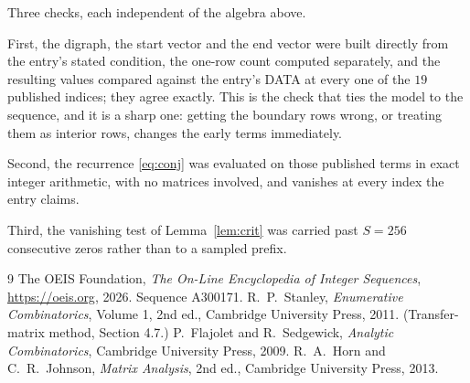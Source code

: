 \documentclass[11pt,a4paper]{article}
\theoremstyle{plain}
\theoremstyle{definition}
\begin{document}
Three checks, each independent of the algebra above.

First, the digraph, the start vector and the end vector were built directly from the
entry's stated condition, the one-row count computed separately, and the resulting values
compared against the entry's DATA at every one of the $19$ published indices; they
agree exactly. This is the check that ties the model to the sequence, and it is a sharp one:
getting the boundary rows wrong, or treating them as interior rows, changes the early terms
immediately.

Second, the recurrence \eqref{eq:conj} was evaluated on those published terms in exact
integer arithmetic, with no matrices involved, and vanishes at every index the entry claims.

Third, the vanishing test of Lemma~\ref{lem:crit} was carried past $S=256$ consecutive
zeros rather than to a sampled prefix.

\begin{thebibliography}{9}
 The OEIS Foundation, \emph{The On-Line Encyclopedia of Integer
Sequences}, \url{https://oeis.org}, 2026. Sequence A300171.
 R.~P.~Stanley, \emph{Enumerative Combinatorics}, Volume 1, 2nd ed.,
Cambridge University Press, 2011. (Transfer-matrix method, Section 4.7.)
 P.~Flajolet and R.~Sedgewick, \emph{Analytic Combinatorics}, Cambridge
University Press, 2009.
 R.~A.~Horn and C.~R.~Johnson, \emph{Matrix Analysis}, 2nd ed., Cambridge
University Press, 2013.
\end{thebibliography}
\end{document}
